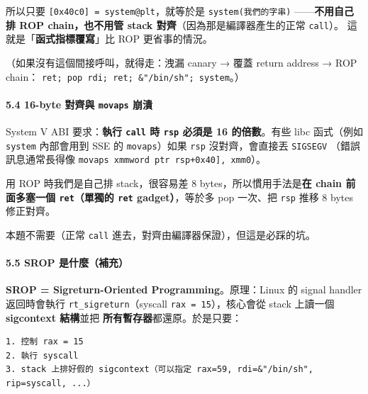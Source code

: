\documentclass[10pt,a4paper]{article}
\begin{document}
所以只要 \texttt{{[}0x40c0{]}\ \allowbreak{}=\ \allowbreak{}system@plt}，就等於是
\texttt{system(我們的字串)} ------\textbf{不用自己排 ROP chain，也不用管
stack 對齊}（因為那是編譯器產生的正常 \texttt{call}）。
這就是「\textbf{函式指標覆寫}」比 ROP 更省事的情況。

（如果沒有這個間接呼叫，就得走：洩漏 canary → 覆蓋 return address → ROP
chain： \texttt{ret;\ \allowbreak{}pop\ \allowbreak{}rdi;\ \allowbreak{}ret;\ \allowbreak{}\&\allowbreak{}"/\allowbreak{}bin/\allowbreak{}sh";\ \allowbreak{}system}。）

\paragraph{\texorpdfstring{5.4 16-byte 對齊與 \texttt{movaps}
崩潰}{5.4 16-byte 對齊與 movaps 崩潰}}\label{byte-ux5c0dux9f4aux8207-movaps-ux5d29ux6f70}

System V ABI 要求：\textbf{執行 \texttt{call} 時 \texttt{rsp} 必須是 16
的倍數}。有些 libc 函式（例如 \texttt{system} 內部會用到 SSE 的
\texttt{movaps}）如果 \texttt{rsp} 沒對齊，會直接丟 \texttt{SIGSEGV}
（錯誤訊息通常長得像
\texttt{movaps\ \allowbreak{}xmmword\ \allowbreak{}ptr\ \allowbreak{}{[}rsp+0x40{]},\allowbreak{}\ \allowbreak{}xmm0}）。

用 ROP 時我們是自己排 stack，很容易差 8 bytes，所以慣用手法是\textbf{在
chain 前面多塞一個 \texttt{ret}（單獨的 \texttt{ret} gadget）}，等於多
pop 一次、把 \texttt{rsp} 推移 8 bytes 修正對齊。

本題不需要（正常 \texttt{call}
進去，對齊由編譯器保證），但這是必踩的坑。

\paragraph{5.5 SROP
是什麼（補充）}\label{srop-ux662fux4ec0ux9ebcux88dcux5145}

\textbf{SROP = Sigreturn-Oriented Programming}。原理：Linux 的 signal
handler 返回時會執行 \texttt{rt\_\allowbreak{}sigreturn}（syscall
\texttt{rax\ \allowbreak{}=\ \allowbreak{}15}），核心會從 stack 上讀一個 \textbf{sigcontext
結構}並把 \textbf{所有暫存器}都還原。於是只要：

\begin{Verbatim}[breaklines=true,breakanywhere=true,breakautoindent=false,fontsize=\fontsize{7.0}{9.5}\selectfont]
1. 控制 rax = 15
2. 執行 syscall
3. stack 上排好假的 sigcontext（可以指定 rax=59, rdi=&"/bin/sh", rip=syscall, ...）
\end{Verbatim}
\end{document}
